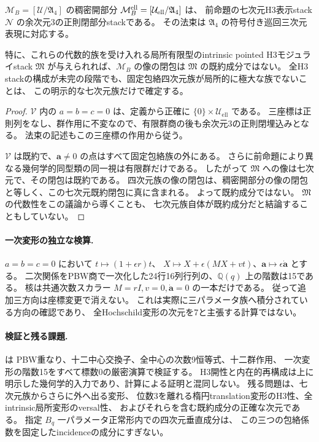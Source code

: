 \begin{theorem}[四次元固定包絡族の非成分性]
\label{thm:triangle-not-component}
$\mathcal M_B=[\mathcal U/\mathfrak A_4]$ の稠密開部分
$\mathcal M_B^{\rm ell}=[\mathcal U_{\mathrm{ell}}/\mathfrak A_4]$ は、
前命題の七次元H3表示stack $\mathcal N$ の余次元3の正則閉部分stackである。
その法束は $\mathfrak A_4$ の符号付き巡回三次元表現に対応する。

特に、これらの代数的族を受け入れる局所有限型のintrinsic pointed H3モジュライstack
$\mathfrak M$ が与えられれば、$\mathcal M_B$ の像の閉包は
$\mathfrak M$ の既約成分ではない。
全H3 stackの構成が未完の段階でも、固定包絡四次元族が局所的に極大な族でないことは、
この明示的な七次元族だけで確定する。
\end{theorem}
\begin{proof}
$\mathcal V$ 内の $a=b=c=0$ は、定義から正確に
$\{0\}\times\mathcal U_{\mathrm{ell}}$ である。
三座標は正則列をなし、群作用に不変なので、有限群商の後も余次元3の正則閉埋込みとなる。
法束の記述もこの三座標の作用から従う。

$\mathcal V$ は既約で、$\boldsymbol a\ne0$ の点はすべて固定包絡族の外にある。
さらに前命題により異なる幾何学的同型類の同一視は有限群だけである。
したがって $\mathfrak M$ への像は七次元で、その閉包は既約である。
四次元族の像の閉包は、稠密開部分の像の閉包と等しく、この七次元既約閉包に真に含まれる。
よって既約成分ではない。
$\mathfrak M$ の代数性をこの議論から導くことも、
七次元族自体が既約成分だと結論することもしていない。
\end{proof}

\paragraph{一次変形の独立な検算.}
$a=b=c=0$ において $t\mapsto(1+\epsilon r)t$、
$X\mapsto X+\epsilon(MX+vt)$、$\boldsymbol a\mapsto\epsilon\dot{\boldsymbol a}$ とする。
二次関係をPBW商で一次化した24行16列行列の、$\mathbb Q(q)$ 上の階数は15である。
核は共通次数スカラー $M=rI,v=0,\dot{\boldsymbol a}=0$ の一本だけである。
従って追加三方向は座標変更で消えない。
これは実際に三パラメータ族へ積分されている方向の確認であり、
全Hochschild変形の次元を7と主張する計算ではない。

\paragraph{検証と残る課題.}
 は
PBW重なり、十二中心交換子、全中心の次数9恒等式、十二群作用、
一次変形の階数15をすべて標数0の厳密演算で検証する。
H3開性と内在的再構成は上に明示した幾何学的入力であり、計算による証明と混同しない。
残る問題は、七次元族からさらに外へ出る変形、
位数3を離れる楕円translation変形のH3性、全intrinsic局所変形のversal性、
およびそれらを含む既約成分の正確な次元である。
指定 $B_q$ 一パラメータ正常形内での四次元垂直成分は、
この三つの包絡係数を固定したincidenceの成分にすぎない。
